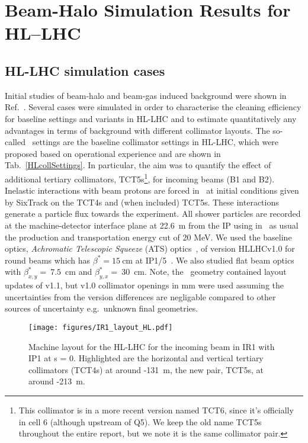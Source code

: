 \section{Beam-Halo Simulation Results for HL--LHC\label{hllhcResults}}

\subsection{HL-LHC simulation cases}

Initial studies of beam-halo and beam-gas induced background were shown in Ref.~\cite{kweeIpac14,ipac2015_rkh}. Several cases were simulated in order to characterise the cleaning efficiency for baseline settings and variants in HL-LHC and to estimate quantitatively any advantages in terms of background with different collimator layouts. The so-called \twosigmaret~settings are the baseline collimator settings in HL-LHC, which were proposed based on operational experience \cite{bruce14_n1_ap_meas} and are shown in Tab.~\ref{HLcollSettings}. In particular, the aim was to quantify the effect of additional tertiary collimators, TCT5s\footnote{This collimator is in a more recent version named TCT6, since it's officially in cell 6 (although upstream of Q5). We keep the old name TCT5s throughout the entire report, but we note it is the same collimator pair.}, for incoming beams (B1 and B2). Inelastic interactions with beam protons are forced in \fluka~at initial conditions given by SixTrack on the TCT4s and (when included) TCT5s. These interactions generate a particle flux towards the experiment. All shower particles are recorded at the machine-detector interface plane at 22.6~m from the IP using in \fluka~as usual the production and transportation energy cut of 20 MeV. We used the baseline optics, \textit{Achromatic Telescopic Squeeze} (ATS) optics~\cite{ATSref}, of version HLLHCv1.0 for round beams which has $\beta^* = 15~$cm at IP1/5~\cite{opticsWebRef}. We also studied flat beam optics with $\beta^*_{x,y} =~7.5$~cm and $\beta^*_{y,x} =~30$~cm. Note, the \fluka~geometry contained layout updates of v1.1, but v1.0 collimator openings in mm were used assuming the uncertainties from the version differences are negligable compared to other sources of uncertainty e.g.~unknown final geometries. 

\begin{figure}[!htb]
\begin{center}
\texttt{[image: figures/IR1\_layout\_HL.pdf]}
\end{center}
\vspace{-0.6cm}
 \caption{Machine layout for the HL-LHC for the incoming beam in IR1 with IP1 at s = 0. Highlighted are the horizontal and vertical tertiary collimators (TCT4s) at around -131~m, the new pair, TCT5s, at around -213~m.
  \label{hllhc_layout}}
\end{figure}


